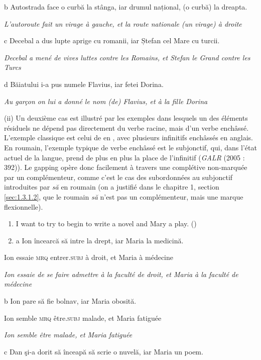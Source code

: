   b  Autostrada face o curbă la stânga, iar drumul național, (o curbă) la dreapta.

{\itshape
L'autoroute fait un virage à gauche, et la route nationale (un virage) à droite}

  c  Decebal a dus lupte aprige cu romanii, iar Ștefan cel Mare cu turcii.

{\itshape
Decebal a mené de vives luttes contre les Romains, et Stefan le Grand contre les Turcs } 

  d  Băiatului i-a pus numele Flavius, iar fetei Dorina.

{\itshape
Au garçon on lui a donné le nom (de) Flavius, et à la fille Dorina}

(ii) Un deuxième cas est illustré par les exemples dans lesquels un des éléments résiduels ne dépend pas directement du verbe racine, mais d'un verbe enchâssé. L'exemple classique est celui de \citet{Ross1970} en , avec plusieurs infinitifs enchâssés en anglais. En roumain, l'exemple typique de verbe enchâssé est le subjonctif, qui, dans l'état actuel de la langue, prend de plus en plus la place de l'infinitif (\textit{GALR} (2005 : 392)). Le gapping opère donc facilement à travers une complétive non-marquée par un complémenteur, comme c'est le cas des subordonnées au subjonctif introduites par \textit{să} en roumain (on a justifié dans le chapitre 1, section \ref{sec:1.3.1.2}, que le roumain \textit{să} n'est pas un complémenteur, mais une marque flexionnelle).


\begin{enumerate}
\item \label{bkm:Ref289362573}I want to try to begin to write a novel and Mary a play.      (\citet[250]{Ross1970})

\item a  Ion încearcă să intre la drept, iar Maria la medicină.


\end{enumerate}
 Ion essaie \textsc{mrq} entrer\textsc{.subj} à droit, et Maria à médecine

{\itshape
Ion essaie de se faire admettre à la faculté de droit, et Maria à la faculté de médecine } 

  b  Ion pare să fie bolnav, iar Maria obosită.

    Ion semble \textsc{mrq} être\textsc{.subj} malade, et Maria fatiguée

{\itshape
Ion semble être malade, et Maria fatiguée}

  c  Dan şi-a dorit să înceapă să scrie o nuvelă, iar Maria un poem.

